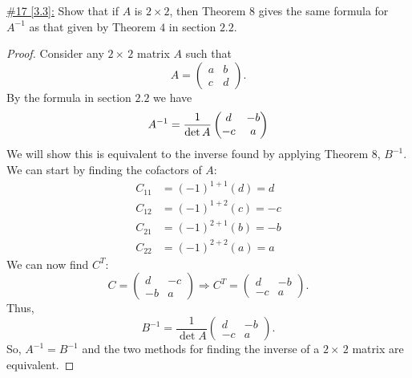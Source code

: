 \documentclass{exam}
\begin{document}
\underline{\#17 [3.3]:} Show that if $A$ is $2 \times 2$, then Theorem $8$ gives the same formula for $A^{-1}$ as that given by Theorem $4$ in section $2.2$.
\begin{solution}
    \begin{proof}
        Consider any $2\times\,2$ matrix $A$ such that 
        \[
            A = \begin{pmatrix}
                a & b \\
                c & d
            \end{pmatrix}.
        \]
        By the formula in section $2.2$ we have 
        \begin{equation}{\label{eq:1}}
            A^{-1} = \frac{1}{\det A}\begin{pmatrix}
                d & -b \\
                -c & a       
            \end{pmatrix}
        \end{equation}
        We will show this is equivalent to the inverse found by applying Theorem $8$, $B^{-1}$. We can start by finding the cofactors of $A$: 
        \begin{align*}
            C_{11} &= \left(-1\right)^{1+1}\left(d\right) = d \\
            C_{12} &= \left(-1\right)^{1+2}\left(c\right) = -c \\
            C_{21} &= \left(-1\right)^{2+1}\left(b\right) = -b \\
            C_{22} &= \left(-1\right)^{2+2}\left(a\right) = a
        \end{align*}
        We can now find $C^{T}$:
        \[
            C = \begin{pmatrix}
                d & -c \\
                -b & a
            \end{pmatrix} 
            \Rightarrow 
            C^{T} = \begin{pmatrix}
                d & -b \\
                -c & a
            \end{pmatrix}.
        \]
        Thus, 
        \[
            B^{-1} = \frac{1}{\det A}\begin{pmatrix}
                d & -b \\
                -c & a
            \end{pmatrix}.
        \]
        So, $A^{-1} = B^{-1}$ and the two methods for finding the inverse of a $2\times\,2$ matrix are equivalent.
    \end{proof}
\end{solution}
\end{document}

